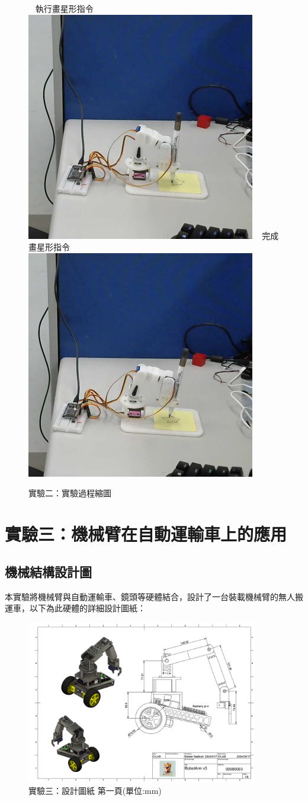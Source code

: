 \documentclass[class=NCU_thesis, crop=false]{standalone}
\begin{document}
\begin{figure}[h]
    ~    
    \subcaptionbox
        {執行畫星形指令
        \label{fig:fig-dataset-contrast-after-adjustment}}
        {\includegraphics[width=0.4\linewidth]{figures/star_0.jpg}}
    ~
    \subcaptionbox
        {完成畫星形指令
        \label{fig:fig-dataset-contrast-after-adjustment}}
        {\includegraphics[width=0.4\linewidth]{figures/star_1.jpg}}   
\caption{實驗二：實驗過程縮圖}
\end{figure}

\section{實驗三：機械臂在自動運輸車上的應用}
\subsection{機械結構設計圖}
本實驗將機械臂與自動運輸車、鏡頭等硬體結合，設計了一台裝載機械臂的無人搬運車，以下為此硬體的詳細設計圖紙：
\begin{figure}[htbp]
    \centering
    \includegraphics[width=0.9\textwidth]{figures/Armv3 (1).PNG}
    \caption{實驗三：設計圖紙 第一頁(單位:mm)}
\end{figure}
\end{document}
